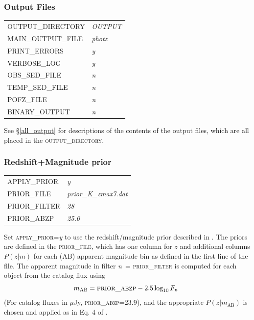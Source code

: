 \documentclass[11pt]{article}
\begin{document}
\subsubsection{Output Files}
\begin{tabular}{ll}
 \textsc{OUTPUT\_DIRECTORY  } & \textsl{   OUTPUT             } \\
 \textsc{MAIN\_OUTPUT\_FILE   } & \textsl{  photz             } \\
 \textsc{PRINT\_ERRORS   } & \textsl{      y                  } \\
 \textsc{VERBOSE\_LOG   } & \textsl{       y                  } \\
 \textsc{OBS\_SED\_FILE   } & \textsl{      n                 } \\
 \textsc{TEMP\_SED\_FILE   } & \textsl{     n                 } \\
 \textsc{POFZ\_FILE        } & \textsl{    n                  } \\
 \textsc{BINARY\_OUTPUT        } & \textsl{    n                  } 
\end{tabular}

See \S\ref{all_output} for descriptions of the contents of the output files,
which are all placed in the \textsc{output\_directory}.  

\subsubsection{Redshift+Magnitude prior}
\begin{tabular}{ll}
 \textsc{APPLY\_PRIOR     } & \textsl{     y                  } \\
 \textsc{PRIOR\_FILE       } & \textsl{    prior\_K\_zmax7.dat  } \\
 \textsc{PRIOR\_FILTER     } & \textsl{    28                 } \\
 \textsc{PRIOR\_ABZP      } & \textsl{     25.0               } 
\end{tabular}

\vspace*{0.25cm}Set \textsc{apply\_prior}=\textsl{y} to use the
redshift/magnitude prior described in \cite{eazy_paper}.  The priors are defined
in the \textsc{prior\_file}, which has one column for $z$ and additional
columns $P(z|m)$ for each (AB) apparent magnitude bin as defined in the first
line of the file.  The apparent magnitude in filter \textsl{n}\ =
\textsc{prior\_filter} is computed for each object from the catalog flux using
\begin{equation}
m_\mathrm{AB} = \textsc{prior\_abzp} - 2.5\log_{10} F_n\ 
\label{prior_mag}
\end{equation}
(For catalog fluxes in $\mu$Jy, \textsc{prior\_abzp}=23.9), and the appropriate
$P(z|m_\mathrm{AB})$ is chosen and applied as in Eq. 4 of \cite{eazy_paper}.
\end{document}
